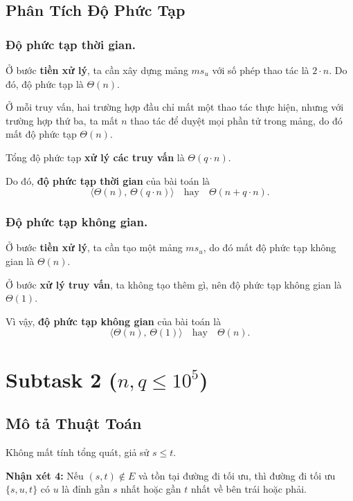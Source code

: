 \documentclass[12pt,a4paper]{article}
\begin{document}
	\subsection{Phân Tích Độ Phức Tạp}
	
	\subsubsection{Độ phức tạp thời gian.} 
	Ở bước \textbf{tiền xử lý}, ta cần xây dựng mảng $ms_u$ với số phép thao tác là $2 \cdot n$. 
	Do đó, độ phức tạp là $\Theta(n)$.
	
	Ở mỗi truy vấn, hai trường hợp đầu chỉ mất một thao tác thực hiện, 
	nhưng với trường hợp thứ ba, ta mất $n$ thao tác để duyệt mọi phần tử trong mảng, 
	do đó mất độ phức tạp $\Theta(n)$.
	
	Tổng độ phức tạp \textbf{xử lý các truy vấn} là $\Theta(q \cdot n)$.
	
	Do đó, \textbf{độ phức tạp thời gian} của bài toán là 
	\[
	\langle \Theta(n),\, \Theta(q \cdot n) \rangle \quad \text{hay} \quad \Theta(n + q \cdot n).
	\]
	
	\subsubsection{Độ phức tạp không gian.}
	Ở bước \textbf{tiền xử lý}, ta cần tạo một mảng $ms_u$, 
	do đó mất độ phức tạp không gian là $\Theta(n)$.
	
	Ở bước \textbf{xử lý truy vấn}, ta không tạo thêm gì, 
	nên độ phức tạp không gian là $\Theta(1)$.
	
	Vì vậy, \textbf{độ phức tạp không gian} của bài toán là 
	\[
	\langle \Theta(n),\, \Theta(1) \rangle \quad \text{hay} \quad \Theta(n).
	\]

	\newpage
	\section{Subtask 2 ($n, q \le 10^5$)}
	
	\subsection{Mô tả Thuật Toán}
	
	Không mất tính tổng quát, giả sử $s \le t$.  
	
	\textbf{Nhận xét 4:}  
	Nếu $(s, t) \notin E$ và tồn tại đường đi tối ưu, thì đường đi tối ưu $\{s, u, t\}$ có $u$ là đỉnh gần $s$ nhất hoặc gần $t$ nhất về bên trái hoặc phải.  
	
\end{document}
